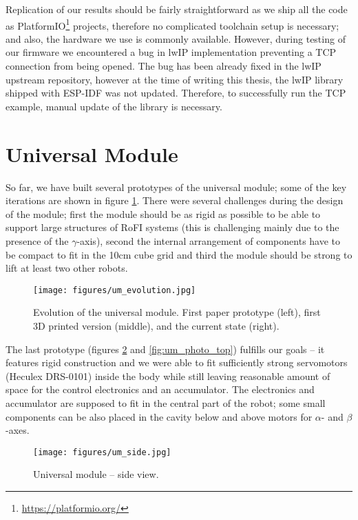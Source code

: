 Replication of our results should be fairly straightforward as we ship all the
code as PlatformIO\footnote{\url{https://platformio.org/}} projects, therefore
no complicated toolchain setup is necessary; and also, the hardware we use is
commonly available. However, during testing of our firmware we encountered a bug
in lwIP implementation preventing a TCP connection from being opened. The bug
has been already fixed in the lwIP upstream repository, however at the time of
writing this thesis, the lwIP library shipped with ESP-IDF was not updated.
Therefore, to successfully run the TCP example, manual update of the library is
necessary.

\section{Universal Module}

So far, we have built several prototypes of the universal module; some of the
key iterations are shown in figure \ref{fig:um_evolution}. There were several
challenges during the design of the module; first the module should be as rigid
as possible to be able to support large structures of RoFI systems (this is
challenging mainly due to the presence of the $\gamma$-axis), second the
internal arrangement of components have to be compact to fit in the 10cm cube
grid and third the module should be strong to lift at least two other robots.

\begin{figure}[!t]
    \centering
    \texttt{[image: figures/um\_evolution.jpg]}
    \caption{Evolution of the universal module. First paper prototype (left),
    first 3D printed version (middle), and the current state (right).}
    \label{fig:um_evolution}
\end{figure}

The last prototype (figures \ref{fig:um_photo_side} and \ref{fig:um_photo_top})
fulfills our goals -- it features rigid construction and we were able to fit
sufficiently strong servomotors (Heculex DRS-0101) inside the body while still
leaving reasonable amount of space for the control electronics and an
accumulator. The electronics and accumulator are supposed to fit in the central
part of the robot; some small components can be also placed in the cavity below
and above motors for $\alpha$- and $\beta$-axes.

\begin{figure}[!t]
    \centering
    \texttt{[image: figures/um\_side.jpg]}
    \caption{Universal module -- side view.}
    \label{fig:um_photo_side}
\end{figure}

